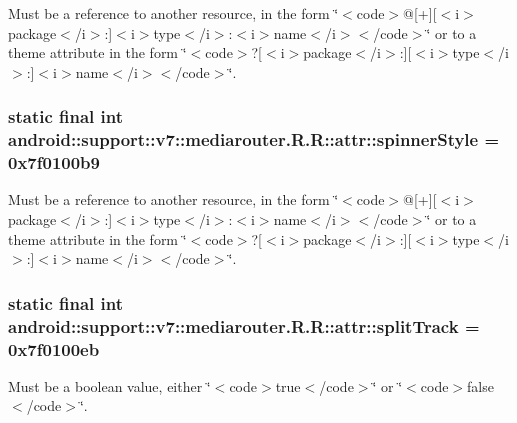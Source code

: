 Must be a reference to another resource, in the form \char`\"{}$<$code$>$@\mbox{[}+\mbox{]}\mbox{[}$<$i$>$package$<$/i$>$:\mbox{]}$<$i$>$type$<$/i$>$:$<$i$>$name$<$/i$>$$<$/code$>$\char`\"{} or to a theme attribute in the form \char`\"{}$<$code$>$?\mbox{[}$<$i$>$package$<$/i$>$:\mbox{]}\mbox{[}$<$i$>$type$<$/i$>$:\mbox{]}$<$i$>$name$<$/i$>$$<$/code$>$\char`\"{}. \hypertarget{classandroid_1_1support_1_1v7_1_1mediarouter_1_1_r_1_1attr_a62abe571bba60d264a256371d2579eb}{
\subsubsection[{spinnerStyle}]{\setlength{\rightskip}{0pt plus 5cm}static final int android::support::v7::mediarouter.R.R::attr::spinnerStyle = 0x7f0100b9}}
\label{classandroid_1_1support_1_1v7_1_1mediarouter_1_1_r_1_1attr_a62abe571bba60d264a256371d2579eb}


Must be a reference to another resource, in the form \char`\"{}$<$code$>$@\mbox{[}+\mbox{]}\mbox{[}$<$i$>$package$<$/i$>$:\mbox{]}$<$i$>$type$<$/i$>$:$<$i$>$name$<$/i$>$$<$/code$>$\char`\"{} or to a theme attribute in the form \char`\"{}$<$code$>$?\mbox{[}$<$i$>$package$<$/i$>$:\mbox{]}\mbox{[}$<$i$>$type$<$/i$>$:\mbox{]}$<$i$>$name$<$/i$>$$<$/code$>$\char`\"{}. \hypertarget{classandroid_1_1support_1_1v7_1_1mediarouter_1_1_r_1_1attr_5f8a7fb3d0ca330f243e807c6892d69a}{
\subsubsection[{splitTrack}]{\setlength{\rightskip}{0pt plus 5cm}static final int android::support::v7::mediarouter.R.R::attr::splitTrack = 0x7f0100eb}}
\label{classandroid_1_1support_1_1v7_1_1mediarouter_1_1_r_1_1attr_5f8a7fb3d0ca330f243e807c6892d69a}


Must be a boolean value, either \char`\"{}$<$code$>$true$<$/code$>$\char`\"{} or \char`\"{}$<$code$>$false$<$/code$>$\char`\"{}. 

